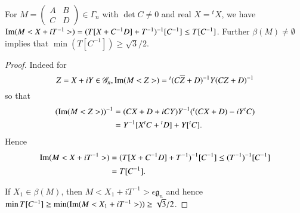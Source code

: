 \setcounter{sublemma}{11}
\begin{sublemma}\label{c1:lem-1.4.12}
For $M=\left(\begin{smallmatrix} A & B\\ C & D
\end{smallmatrix}\right)\in \Gamma_{n}$ with $\det C\neq 0$ and real
$X={}^{t}X$, we have
$\operatorname{Im}(M<X+iT^{-1}>)=(T[X+C^{-1}D]+T^{-1})^{-1}[C^{-1}]\leq
T[C^{-1}]$. Further $\beta(M)\neq \emptyset$ implies that $\min
(T[C^{-1}])\geq \sqrt{3}/2$.
\end{sublemma}

\begin{proof}
Indeed for 
$$
Z=X+iY\in\mathscr{G}_{n},
\operatorname{Im}(M<Z>)={}^{t}(C\overline{Z}+D)^{-1}Y(CZ+D)^{-1}
$$
so that
\begin{align*}
(\operatorname{Im}
(M<Z>))^{-1}&=(CX+D+iCY)Y^{-1}({}^{t}(CX+D)-iY{}^{t}C)\\
&=Y^{-1}[X{}^{t}C+{}^{t}D]+Y[{}^{t}C].
\end{align*}
Hence
\begin{align*}
\operatorname{Im}(M<X+iT^{-1}>)&=(T[X+C^{-1}D]+T^{-1})^{-1}[C^{-1}]\leq
(T^{-1})^{-1}[C^{-1}]\\
&=T[C^{-1}]. 
\end{align*}

If $X_{1}\in \beta(M)$, then $M<X_{1}+iT^{-1}>\epsilon
\mathfrak{g}_{n}$ and hence $\min T[C^{-1}]\geq \min (\operatorname{Im}
(M<X_{1}+iT^{-1}>))\geq \sqrt{3}/2$.


\end{proof}
